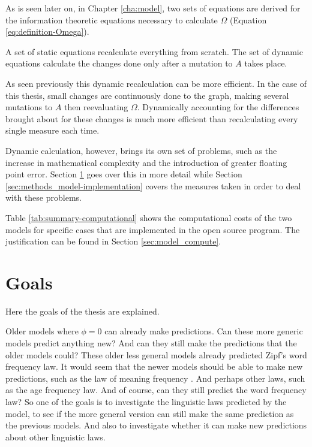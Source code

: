 As is seen later on, in Chapter \ref{cha:model}, two sets of equations are derived for the information theoretic equations necessary to calculate $\Omega$ (Equation \eqref{eq:definition-Omega}).

A set of static equations recalculate everything from scratch.
The set of dynamic equations calculate the changes done only after a mutation to $A$ takes place.

As seen previously this dynamic recalculation can be more efficient.
In the case of this thesis, small changes are continuously done to the graph, making several mutations to $A$ then reevaluating $\Omega$.
Dynamically accounting for the differences brought about for these changes is much more efficient than recalculating every single measure each time.

Dynamic calculation, however, brings its own set of problems, such as the increase in mathematical complexity and the introduction of greater floating point error.
Section \ref{sec:introduction_goals} goes over this in more detail while Section \ref{sec:methods_model-implementation} covers the measures taken in order to deal with these problems.

Table \ref{tab:summary-computational} shows the computational costs of the two models for specific cases that are implemented in the \CC{} open source program.
The justification can be found in Section \ref{sec:model_compute}.



\section{Goals}
\label{sec:introduction_goals}

Here the goals of the thesis are explained.

Older models \cite{Ferrer2003a} \cite{Ferrer2005a} where $\phi=0$ can already make predictions.
Can these more generic models predict anything new? And can they still make the predictions  that the older models could?
These older less general models already predicted Zipf's word frequency law.
It would seem that the newer models should be able to make new predictions, such as the law of meaning frequency \cite{Ferrer2018a}.
And perhaps other laws, such as the age frequency law.
And of course, can they still predict the word frequency law?
So one of the goals is to investigate the linguistic laws predicted by the model, to see if the more general version can still make the same prediction as the previous models.
And also to investigate whether it can make new predictions about other linguistic laws.

